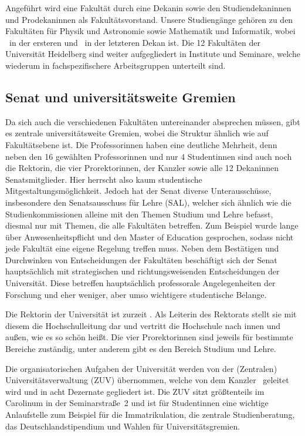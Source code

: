 Angeführt wird eine Fakultät durch eine Dekanin sowie den Studiendekaninnen und Prodekaninnen als Fakultätsvorstand. Unsere Studiengänge gehören zu den Fakultäten für Physik und Astronomie sowie Mathematik und Informatik, wobei \dekanphysiklang\ in der ersteren und \dekanmathelang\ in der letzteren Dekan ist. Die 12 Fakultäten der Universität Heidelberg sind weiter aufgegliedert in Institute und Seminare, welche wiederum in fachspezifischere Arbeitsgruppen unterteilt sind.

\subsection{Senat und universitätsweite Gremien}
Da sich auch die verschiedenen Fakultäten untereinander absprechen müssen, gibt es zentrale universitätsweite Gremien, wobei die Struktur ähnlich wie auf Fakultätsebene ist. Die Professorinnen haben eine deutliche Mehrheit, denn neben den 16 gewählten Professorinnen und nur 4 Studentinnen sind auch noch die Rektorin, die vier Prorektorinnen, der Kanzler sowie alle 12 Dekaninnen Senatsmitglieder. Hier herrscht also kaum studentische Mitgestaltungsmöglichkeit. Jedoch hat der Senat diverse Unterausschüsse, insbesondere den Senatsausschuss für Lehre (SAL), welcher sich ähnlich wie die Studienkommissionen alleine mit den Themen Studium und Lehre befasst, diesmal nur mit Themen, die alle Fakultäten betreffen. Zum Beispiel wurde lange über Anwesenheitspflicht und den Master of Ed\-u\-ca\-tion gesprochen, sodass nicht jede Fakultät eine eigene Regelung treffen muss. Neben dem Bestätigen und Durchwinken von Entscheidungen der Fakultäten beschäftigt sich der Senat hauptsächlich mit strategischen und richtungsweisenden Entscheidungen der Universität.
Diese betreffen hauptsächlich professorale Angelegenheiten der Forschung und eher weniger, aber umso wichtigere studentische Belange.

Die Rektorin der Universität ist zurzeit \rektor. Als Leiterin des Rektorats stellt sie mit diesem die Hochschulleitung dar und vertritt die Hochschule nach innen und außen, wie es so schön heißt. Die vier Prorektorinnen sind jeweils für bestimmte Bereiche zuständig, unter anderem gibt es den Bereich Studium und Lehre.

Die organisatorischen Aufgaben der Universität werden von der (Zentralen) Universitätsverwaltung (ZUV) übernommen, welche von dem Kanzler \kanzler\ geleitet wird und in acht Dezernate gegliedert ist. Die ZUV sitzt größtenteils im Carolinum in der Seminarstraße~2 und ist für Studentinnen eine wichtige Anlaufstelle zum Beispiel für die Immatrikulation, die zentrale Studienberatung, das Deutschlandstipendium und Wahlen für Universitätsgremien.

